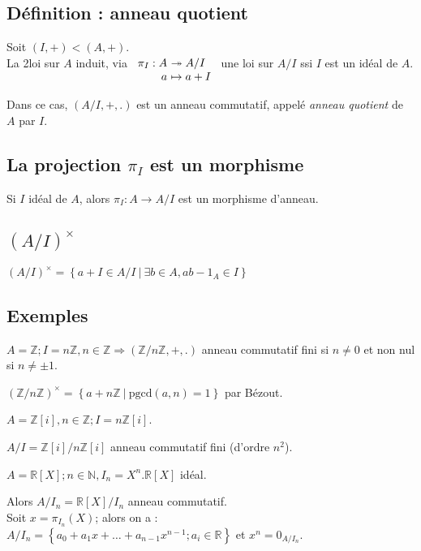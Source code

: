 \documentclass[reqno,a4paper,10pt]{report}
\makeatletter
\newcommand{\set}[1]{\left\lbrace #1 \right\rbrace} %
\newcommand{\IZ}{\ensuremath{\mathbb{Z}}\xspace} %
\newcommand{\IR}{\ensuremath{\mathbb{R}}\xspace} %
\newcommand{\IN}{\ensuremath{\mathbb{N}}\xspace} %
\newcommand{\so}{\Rightarrow}
\newcommand{\surj}{\twoheadrightarrow}
\newcommand{\pgcd}{\mathrm{pgcd}} %
\newcommand{\Such}{\ \Big| \ }
\newcommand{\such}{\ | \ }
\let\olditemize=\itemize%
\renewenvironment{itemize}{%
    \olditemize%
  }{%
    \@noparlisttrue%
    \endlist%
  }%
\makeatother
\begin{document}
\subsection{Définition : anneau quotient}
Soit $(I,+) < (A,+)$.\\
La 2\ieme loi sur $A$ induit, via $\begin{array}[t]{r@{\ }l}
  \pi_I : A &\surj A/I\\
  a &\mapsto a+I
\end{array}$ une loi sur $A/I$ ssi $I$ est
un idéal de $A$.

Dans ce cas, $(A/I, +, .)$ est un anneau commutatif, appelé \emph{anneau
quotient} de $A$ par $I$.


\subsection{La projection $\pi_I$ est un morphisme}
Si $I$ idéal de $A$, alors $\pi_I: A \to A/I$ est un morphisme d'anneau.

\subsection{$(A/I)^\times$}
$(A/I)^\times = \set{a + I \in A/I \Such \exists b \in A, ab - 1_A \in I}$

\subsection{Exemples}
\begin{itemize}
  \item $A=\IZ; I=n\IZ, n \in \IZ \so (\IZ/n\IZ, +, .)$ anneau commutatif fini
    si $n\neq 0$ et non nul si $n\neq \pm 1$.
  
    $(\IZ/n\IZ)^\times = \set{a+n\IZ \such \pgcd(a,n)=1}$ par Bézout.

  \item $A=\IZ[i], n \in \IZ; I=n\IZ[i]$.

    $A/I=\IZ[i]/n\IZ[i]$ anneau commutatif fini (d'ordre $n^2$).

  \item $A=\IR[X]; n \in \IN, I_n=X^n.\IR[X]$ idéal.

    Alors $A/I_n=\IR[X]/I_n$ anneau commutatif.\\
    Soit $x=\pi_{I_n}(X)$; alors on a :\\
    $A/I_n=\set{a_0+a_1 x + \dots + a_{n-1} x^{n-1}; a_i \in \IR}$ et $x^n =
    0_{A/I_n}$.
\end{itemize}
\end{document}
